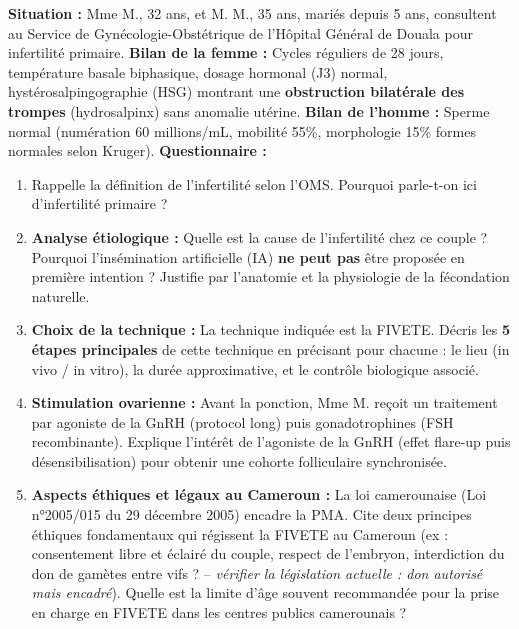 \documentclass[11pt]{article}
\newcommand{\cle}[1]{{\popxbold\color{popdark}#1}}
\begin{document}
\begin{exercice}
\textbf{Situation :} Mme M., 32 ans, et M. M., 35 ans, mariés depuis 5 ans, consultent au Service de Gynécologie-Obstétrique de l'Hôpital Général de Douala pour infertilité primaire.
\textbf{Bilan de la femme :} Cycles réguliers de 28 jours, température basale biphasique, dosage hormonal (J3) normal, hystérosalpingographie (HSG) montrant une \textbf{obstruction bilatérale des trompes} (hydrosalpinx) sans anomalie utérine.
\textbf{Bilan de l'homme :} Sperme normal (numération 60 millions/mL, mobilité 55\%, morphologie 15\% formes normales selon Kruger).
\textbf{Questionnaire :}
\begin{enumerate}
    \item Rappelle la définition de l'infertilité selon l'OMS. Pourquoi parle-t-on ici d'infertilité \og primaire \fg ?
    \item \textbf{Analyse étiologique :} Quelle est la cause de l'infertilité chez ce couple ? Pourquoi l'insémination artificielle (IA) \textbf{ne peut pas} être proposée en première intention ? Justifie par l'anatomie et la physiologie de la fécondation naturelle.
    \item \textbf{Choix de la technique :} La technique indiquée est la \cle{FIVETE}. Décris les \textbf{5 étapes principales} de cette technique en précisant pour chacune : le lieu (in vivo / in vitro), la durée approximative, et le contrôle biologique associé.
    \item \textbf{Stimulation ovarienne :} Avant la ponction, Mme M. reçoit un traitement par agoniste de la GnRH (protocol long) puis gonadotrophines (FSH recombinante). Explique l'intérêt de l'agoniste de la GnRH (effet \og flare-up \fg puis désensibilisation) pour obtenir une cohorte folliculaire synchronisée.
    \item \textbf{Aspects éthiques et légaux au Cameroun :} La loi camerounaise (Loi n°2005/015 du 29 décembre 2005) encadre la PMA. Cite deux principes éthiques fondamentaux qui régissent la FIVETE au Cameroun (ex : consentement libre et éclairé du couple, respect de l'embryon, interdiction du don de gamètes entre vifs ? -- \textit{vérifier la législation actuelle : don autorisé mais encadré}). Quelle est la limite d'âge souvent recommandée pour la prise en charge en FIVETE dans les centres publics camerounais ?
\end{enumerate}
\end{exercice}
\end{document}
